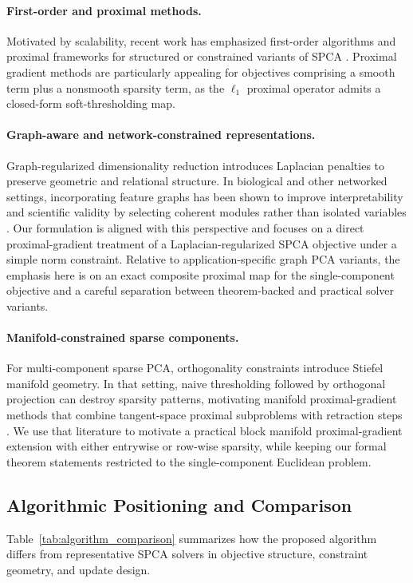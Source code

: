 \documentclass[10pt,twocolumn,letterpaper]{article}
\theoremstyle{definition}
\begin{document}
\paragraph{First-order and proximal methods.}
Motivated by scalability, recent work has emphasized first-order algorithms and proximal frameworks for structured or constrained variants of SPCA \cite{qiu2023biometrikaGradientSPCA}. Proximal gradient methods are particularly appealing for objectives comprising a smooth term plus a nonsmooth sparsity term, as the $\ell_1$ proximal operator admits a closed-form soft-thresholding map.

\paragraph{Graph-aware and network-constrained representations.}
Graph-regularized dimensionality reduction introduces Laplacian penalties to preserve geometric and relational structure. In biological and other networked settings, incorporating feature graphs has been shown to improve interpretability and scientific validity by selecting coherent modules rather than isolated variables \cite{miao2022genomeNetworkSPCA}. Our formulation is aligned with this perspective and focuses on a direct proximal-gradient treatment of a Laplacian-regularized SPCA objective under a simple norm constraint. Relative to application-specific graph PCA variants, the emphasis here is on an exact composite proximal map for the single-component objective and a careful separation between theorem-backed and practical solver variants.

\paragraph{Manifold-constrained sparse components.}
For multi-component sparse PCA, orthogonality constraints introduce Stiefel manifold geometry. In that setting, naive thresholding followed by orthogonal projection can destroy sparsity patterns, motivating manifold proximal-gradient methods that combine tangent-space proximal subproblems with retraction steps \cite{chen2020manpg,chen2020amanpg,chen2024manpgsurvey}. We use that literature to motivate a practical block manifold proximal-gradient extension with either entrywise or row-wise sparsity, while keeping our formal theorem statements restricted to the single-component Euclidean problem.

\subsection{Algorithmic Positioning and Comparison}
Table~\ref{tab:algorithm_comparison} summarizes how the proposed algorithm differs from representative SPCA solvers in objective structure, constraint geometry, and update design.
\end{document}
